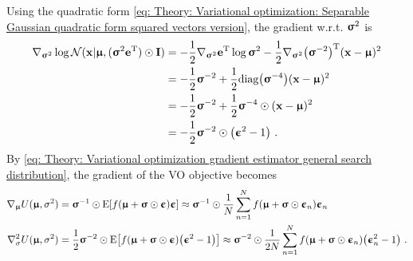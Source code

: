 Using the quadratic form \eqref{eq: Theory: Variational optimization: Separable Gaussian quadratic form squared vectors version}, the gradient w.r.t. $\sigmab^2$ is
\begin{align}\label{eq: Theory: Variational optimization multivariate isotropic gaussian search gradients (sigmab^2)}
    \nabla_{\sigmab^2} \log\mathcal{N}(\x|\mub,(\sigmab^2\e\transpose)\odot\I)
    &= - \frac{1}{2}\nabla_{\sigmab^2}\e\transpose\log\sigmab^2 - \frac{1}{2}\nabla_{\sigmab^2}\pa{\sigmab^{-2}}^\text{T}(\x-\mub)^2 \nonumber\\
    &= - \frac{1}{2}\sigmab^{-2}+ \frac{1}{2}\text{diag}\pa{\sigmab^{-4}}(\x-\mub)^2 \nonumber\\
    &= -\frac{1}{2}\sigmab^{-2} + \frac{1}{2} \sigmab^{-4}\odot(\x-\mub)^2\nonumber\\
    &= -\frac{1}{2}\sigmab^{-2} \odot \pa{\epsilonb^2 - 1} \ .
\end{align}
By \eqref{eq: Theory: Variational optimization gradient estimator general search distribution}, the gradient of the \gls{VO} objective becomes
\begin{align}
    \nabla_\mub U(\mub,\sigma^2) &= \sigmab^{-1}\odot\text{E}\bra{f(\mub + \sigmab\odot\epsilonb)\epsilonb} \approx \sigmab^{-1}\odot\frac{1}{N}\sum_{n=1}^N f(\mub+\sigmab\odot\epsilonb_n)\epsilonb_n\label{eq: Theory: Variational optimization separable gaussian gradient estimators}\\
    \nabla_\sigma^2 U(\mub,\sigma^2) &= \frac{1}{2}\sigmab^{-2}\odot\text{E}\bra{f(\mub + \sigmab\odot\epsilonb)\pa{\epsilonb^2 - 1}} \approx \sigmab^{-2}\odot\frac{1}{2N}\sum_{n=1}^N f(\mub + \sigmab\odot\epsilonb_n)\pa{\epsilonb_n^2 - 1} \ .\nonumber
\end{align}

